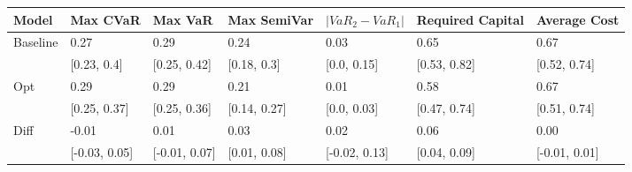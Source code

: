 \begin{tabular}{lllllll}
\toprule
   Model &      Max CVaR &       Max VaR &  Max SemiVar & $|VaR_2 - VaR_1|$ & Required Capital &  Average Cost \\
\midrule
Baseline &          0.27 &          0.29 &         0.24 &              0.03 &             0.65 &          0.67 \\
         &   [0.23, 0.4] &  [0.25, 0.42] &  [0.18, 0.3] &       [0.0, 0.15] &     [0.53, 0.82] &  [0.52, 0.74] \\
     Opt &          0.29 &          0.29 &         0.21 &              0.01 &             0.58 &          0.67 \\
         &  [0.25, 0.37] &  [0.25, 0.36] & [0.14, 0.27] &       [0.0, 0.03] &     [0.47, 0.74] &  [0.51, 0.74] \\
    Diff &         -0.01 &          0.01 &         0.03 &              0.02 &             0.06 &          0.00 \\
         & [-0.03, 0.05] & [-0.01, 0.07] & [0.01, 0.08] &     [-0.02, 0.13] &     [0.04, 0.09] & [-0.01, 0.01] \\
\bottomrule
\end{tabular}
